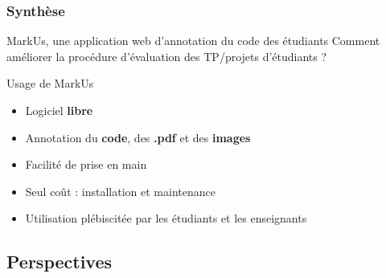 \documentclass[svgnames,hyperref, french, xcolor=dvipsnames,usenames]{beamer}		        %
\begin{document}
\frame
{
        \frametitle{Synthèse}

        \begin{alertblock}{MarkUs, une application web d'annotation du code des étudiants}
                Comment améliorer la procédure d'évaluation des TP/projets d'étudiants ?
        \end{alertblock}

        \begin{block}{Usage de MarkUs}
                \begin{itemize}
                        \item Logiciel \textbf{libre}
                        \item Annotation du \textbf{code}, des \textbf{.pdf} et des \textbf{images}
                        \item Facilité de prise en main
                        \item Seul coût : installation et maintenance
                        \item Utilisation plébiscitée par les étudiants et les enseignants
                \end{itemize}
        \end{block}
}

\subsection*{Perspectives}

\end{document}
